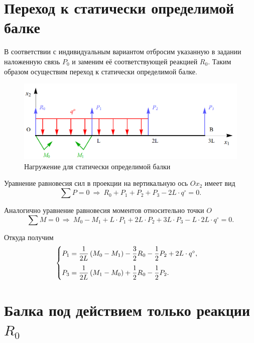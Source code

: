 \documentclass[12pt, a4paper]{article}
\begin{document}
\section{Переход к статически определимой балке}

В соответствии с индивидуальным вариантом отбросим указанную в задании наложенную связь $P_0$ и заменим её соответствующей реакцией $R_0$. Таким образом осуществим переход к статически определимой балке.

\begin{figure}[!h]
	\centering
	\includegraphics[width=0.75\linewidth]{plot-3}
	\caption{Нагружение для статически определимой балки}
\end{figure}

\newpage

Уравнение равновесия сил в проекции на вертикальную ось $Ox_2$ имеет вид
\begin{equation*}
	\sum P = 0 \ \Rightarrow \ R_0 + P_1 + P_2 + P_3 - 2L \cdot q^{\circ} = 0.
\end{equation*}

Аналогично уравнение равновесия моментов относительно точки $O$
\begin{equation*}
	\sum M = 0 \ \Rightarrow \ M_0 - M_1 + L \cdot P_1 + 2L \cdot P_2 + 3L \cdot P_3 - L \cdot 2L \cdot q^{\circ} = 0.
\end{equation*}

Откуда получим
\begin{equation}
	\begin{cases} \vspace{0.75em}
		P_1 = \dfrac{1}{2L} \left( M_0 - M_1 \right) - \dfrac{3}{2} R_0 - \dfrac{1}{2} P_2 + 2L \cdot q^{\circ}, \\ 
		P_3 = \dfrac{1}{2L} \left( M_1 - M_0 \right) + \dfrac{1}{2} R_0 - \dfrac{1}{2} P_2. \\
	\end{cases}
	\label{eqP0P1}
\end{equation}

\section{Балка под действием только реакции $R_0$}
\end{document}
